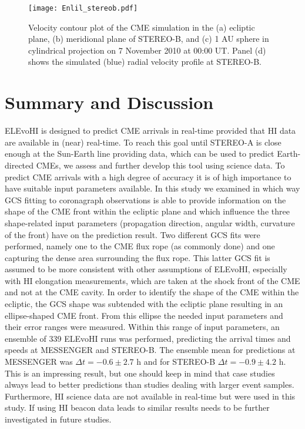 \documentclass[draft]{agujournal}
\begin{document}
\begin{figure}[h]
\centering
\texttt{[image: Enlil\_stereob.pdf]}
\caption{Velocity contour plot of the CME simulation in the (a) ecliptic plane, (b) meridional plane of STEREO-B, and (c) 1 AU sphere in cylindrical projection on 7 November 2010 at 00:00 UT. Panel (d) shows the simulated (blue) radial velocity profile at STEREO-B.}
\label{fig:enlil}
\end{figure}

\section{Summary and Discussion}

ELEvoHI is designed to predict CME arrivals in real-time provided that HI data are available in (near) real-time. To reach this goal until STEREO-A is close enough at the Sun-Earth line providing data, which can be used to predict Earth-directed CMEs, we assess and further develop this tool using science data. To predict CME arrivals with a high degree of accuracy it is of high importance to have suitable input parameters available. In this study we examined in which way GCS fitting to coronagraph observations is able to provide information on the shape of the CME front within the ecliptic plane and which influence the three shape-related input parameters (propagation direction, angular width, curvature of the front) have on the prediction result. 
Two different GCS fits were performed, namely one to the CME flux rope (as commonly done) and one capturing the dense area surrounding the flux rope. This latter GCS fit is assumed to be more consistent with other assumptions of ELEvoHI, especially with HI elongation measurements, which are taken at the shock front of the CME and not at the CME cavity. In order to identify the shape of the CME within the ecliptic, the GCS shape was subtended with the ecliptic plane resulting in an ellipse-shaped CME front. From this ellipse the needed input parameters and their error ranges were measured. 
Within this range of input parameters, an ensemble of 339 ELEvoHI runs was performed, predicting the arrival times and speeds at MESSENGER and STEREO-B. The ensemble mean for predictions at MESSENGER was $\Delta t=-0.6 \pm 2.7$ h and for STEREO-B $\Delta t=-0.9 \pm 4.2$ h. This is an impressing result, but one should keep in mind that case studies always lead to better predictions than studies dealing with larger event samples. Furthermore, HI science data are not available in real-time but were used in this study. If using HI beacon data leads to similar results needs to be further investigated in future studies. 
\end{document}
